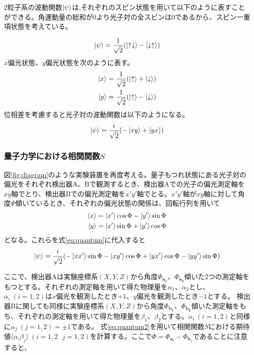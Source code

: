 \documentclass[../../main.tex]{subfiles}
\numberwithin{equation}{section}
\numberwithin{table}{section}
\numberwithin{figure}{section}
\begin{document}
$2$粒子系の波動関数$\ket{\psi} $は,それぞれのスピン状態を用いて以下のように表すことができる。角運動量の総和が$0$より光子対の全スピンは$0$であるから、スピン一重項状態を考えている。

\begin{align}
	\ket{\psi} = \frac{1}{\sqrt{2}} (\ket{\uparrow \downarrow}-\ket{\downarrow\uparrow})
\end{align}
$x$偏光状態、$y$偏光状態を次のように表す。
\begin{align}
	\ket{x} = \frac{1}{\sqrt{2}} (\ket{\uparrow}+\ket{\downarrow}) \\
	\ket{y} = \frac{1}{\sqrt{2}} (\ket{\uparrow }-\ket{\downarrow})
\end{align}
位相差を考慮すると光子対の波動関数は以下のようになる。
\begin{align}
	\ket{\psi} = \frac{i}{\sqrt{2}} (-\ket{xy}+\ket{yx})\label{eq:quantum}
\end{align}

\subsubsection{量子力学における相関関数$S$}

図\ref{fig:diagram}のような実験装置を再度考える。量子もつれ状態にある光子対の偏光をそれぞれ検出器A、Bで観測するとき、検出器Aでの光子の偏光測定軸を$xy$軸でとり、検出器Bでの偏光測定軸を$x'y'$軸でとる。$x'y'$軸が$xy$軸に対して角度$\Phi$傾いているとき、それぞれの偏光状態の関係は、回転行列を用いて
\begin{align}
	\ket{x} = \ket{x'}\cos{\Phi}-\ket{y'}\sin{\Phi} \\
	\ket{y} = \ket{x'}\sin{\Phi}+\ket{y'}\cos{\Phi}
\end{align}
となる。これらを式\eqref{eq:quantum}に代入すると
\begin{align}
	\ket{\psi} = \frac{i}{\sqrt{2}} (-\ket{xx'}\sin{\Phi}-\ket{xy'}\cos{\Phi}+\ket{yx'}\cos{\Phi}-\ket{yy'}\sin{\Phi})\label{eq:quantum2}
\end{align}

ここで、検出器Aは実験座標系$(X,Y,Z)$から角度$\Phi_{\mathbf{a_1}}$、$\Phi_{\mathbf{a_2}}$傾いた$2$つの測定軸をもつとする。それぞれの測定軸を用いて得た物理量を$\alpha_1$、$\alpha_2$とし、$\alpha_i~(i=1,2)$は$x$偏光を観測したとき$+1$、$y$偏光を観測したとき$-1$とする。
検出器Bに関しても同様に実験座標系$(X,Y,Z)$から角度$\Phi_{\mathbf{b_1}}$、$\Phi_{\mathbf{b_2}}$傾いた測定軸をもち、それぞれの測定軸を用いて得た物理量を$\beta_1$、$\beta_2$とする。$\alpha_i~(i=1,2)$と同様に$\alpha_j~(j=1,2)=\pm1$である。
\newpage
式\eqref{eq:quantum2}を用いて相関関数$S$における期待値$\langle \alpha_i\beta_j \rangle~(i=1,2~~~j=1,2)$を計算する。ここで$\Phi=\Phi_{\mathbf{a}_{\mathit{i}}}-\Phi_{\mathbf{b}_{\mathit{j}}}$であることに注意すると、
\end{document}
